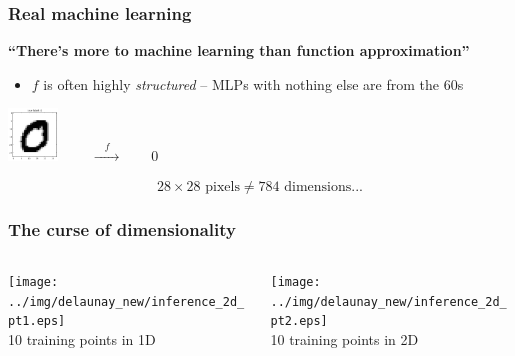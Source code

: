 \documentclass[aspectratio=169]{beamer}
\begin{document}
\begin{frame}
\frametitle{Real machine learning}

\begin{center}
{\large \bf ``There's more to machine learning than function approximation''}
\end{center}

\pause
\bigskip

\begin{itemize}
\item $f$ is often highly {\sl structured} -- MLPs with nothing else are from the 60s
\end{itemize}

\begin{center}
\includegraphics[width=0.1\textwidth]{../img/delaunay_new/mnist_data_0.png}
{\huge $\qquad \xrightarrow{\quad f \quad} \qquad 0$}
\end{center}

\bigskip
$$
28 \times 28 \text{ pixels} \neq 784 \text{ dimensions...}
$$
\end{frame}

\begin{frame}
\frametitle{The curse of dimensionality}

\begin{columns}
\begin{column}{0.5\textwidth}
\begin{center}
\texttt{[image: ../img/delaunay\_new/inference\_2d\_pt1.eps]}\\
10 training points in 1D
\end{center}
\end{column}

\begin{column}{0.5\textwidth}
\begin{center}
\texttt{[image: ../img/delaunay\_new/inference\_2d\_pt2.eps]}\\
10 training points in 2D
\end{center}
\end{column}
\end{columns}
\end{frame}
\end{document}
